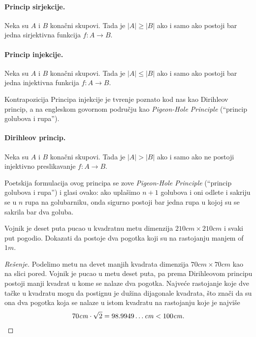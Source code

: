 \paragraph{Princip sirjekcije.}
  Neka su $A$ i $B$ kona\v cni skupovi. Tada je $|A| \ge |B|$ ako i samo ako postoji bar jedna sirjektivna funkcija $f : A \to B$.
\begin{center}
  
\end{center}

\paragraph{Princip injekcije.}
  Neka su $A$ i $B$ kona\v cni skupovi. Tada je $|A| \le |B|$ ako i samo ako postoji bar jedna injektivna funkcija $f : A \to B$.
\begin{center}
  
\end{center}

Kontrapozicija Principa injekcije je tvr\dj enje poznato kod nas kao Dirihleov princip, a na engleskom govornom podru\v cju kao
\emph{Pigeon-Hole Principle} (``princip golubova i rupa'').

\paragraph{Dirihleov princip.}
  Neka su $A$ i $B$ kona\v cni skupovi. Tada je $|A| > |B|$ ako i samo ako ne postoji injektivno preslikavanje $f : A \to B$.
  
\medskip

Poetskija formulacija ovog principa se zove \emph{Pigeon-Hole Principle} (``princip golubova i rupa'') i glasi ovako:
ako upla\v simo $n + 1$ golubova i oni odlete i sakriju se u $n$ rupa na golubarniku, onda sigurno postoji bar jedna rupa
u kojoj su se sakrila bar dva goluba.

\begin{EX}
  Vojnik je deset puta pucao u kvadratnu metu dimenzija $210\mathit{cm} \times 210\mathit{cm}$ i svaki put pogodio.
  Dokazati da postoje dva pogotka koji su na rastojanju manjem of $1\mathit{m}$.
\end{EX}

\noindent
\begin{minipage}{3in}
  \begin{proof}[Re\v senje]
    Podelimo metu na devet manjih kvadrata dimenzija $70\mathit{cm} \times 70\mathit{cm}$ kao na slici pored.
    Vojnik je pucao u metu deset puta, pa prema Dirihleovom principu
    postoji manji kvadrat u kome se nalaze dva pogotka.
    Najve\'ce rastojanje koje dve ta\v cke u kvadratu mogu da postignu je du\v zina dijagonale kvadrata, \v sto zna\v ci
    da su ona dva pogotka koja se nalaze u istom kvadratu na rastojanju koje je najvi\v se
    $$
      70\mathit{cm} \cdot \sqrt 2 = 98.9949\ldots\mathit{cm} < 100\mathit{cm}.\qedhere
    $$
  \end{proof}
\end{minipage}
\hfill
\begin{minipage}{2.5in}
  \begin{center}
    
  \end{center}
\end{minipage}


